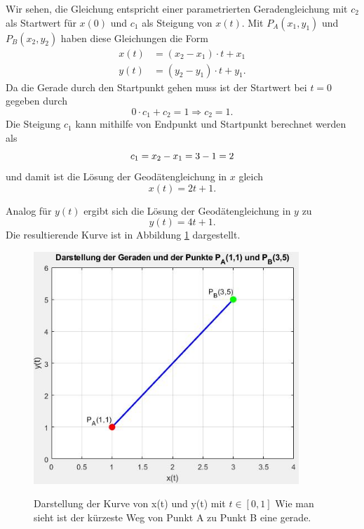 Wir sehen, die Gleichung entspricht einer parametrierten Geradengleichung mit $c_2$ als Startwert für $x(0)$ und $c_1$ als Steigung von $x(t)$. 
Mit $P_A(x_1,y_1)$ und $P_B(x_2,y_2)$ haben diese Gleichungen die Form
\begin{align}
	x(t) &= (x_2 - x_1) \cdot t + x_1 \\
	y(t) &= (y_2 - y_1) \cdot t + y_1 .
\end{align}
Da die Gerade durch den Startpunkt gehen muss ist der Startwert bei $t=0$ gegeben durch
\begin{equation}
	0 \cdot c_1 + c_2 = 1 \Rightarrow c_2 = 1 .	
\end{equation}
Die Steigung $c_1$ kann mithilfe von Endpunkt und Startpunkt berechnet werden als
\begin{equation}
	c_1 = x_2 - x_1 \\ = 3-1 \\ = 2
\end{equation}
und damit ist die Lösung der Geodätengleichung in $x$ gleich
\begin{equation}
	x(t) = 2t + 1 .
	\label{geodaeten:equation:StaKartesisch:LoesungX}
\end{equation}

Analog für $y(t)$ ergibt sich die Lösung der Geodätengleichung in $y$ zu
\begin{equation}
	y(t) = 4t + 1 .
	\label{geodaeten:equation:StaKartesisch:LoesungY}
\end{equation}
Die resultierende Kurve ist in Abbildung \ref{geodaeten:figure:Standardverfahren:Kartesisch:figure1} dargestellt.
\begin{figure}
	\centering
	\includegraphics[width=10cm]{papers/geodaeten/Abbildungen/Standardverfahren/Kartesisch}
	\label{geodaeten:figure:Standardverfahren:Kartesisch:figure1}
	\caption{Darstellung der Kurve von x(t) und y(t) mit $t \in [0 , 1]$ Wie man sieht ist der kürzeste Weg von Punkt A zu Punkt B eine gerade.}
\end{figure}
